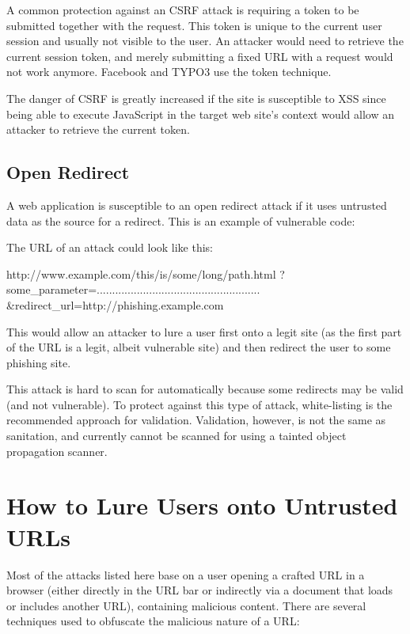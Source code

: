 A common protection against an CSRF attack is requiring a token to be submitted together with the request. This token is unique to the current user session and usually not visible to the user. An attacker would need to retrieve the current session token, and merely submitting a fixed URL with a request would not work anymore. Facebook and TYPO3 use the token technique.~\cite{facebook-tokens, typo3-csrf}

The danger of CSRF is greatly increased if the site is susceptible to XSS since being able to execute JavaScript in the target web site's context would allow an attacker to retrieve the current token.


\subsection{Open Redirect}
\label{open-redirect}

A web application is susceptible to an open redirect attack if it uses untrusted data as the source for a redirect. This is an example of vulnerable code:


The URL of an attack could look like this:

\begin{textcode}
http://www.example.com/this/is/some/long/path.html
  ?some_parameter=.....................................................
  &redirect_url=http://phishing.example.com
\end{textcode}

This would allow an attacker to lure a user first onto a legit site (as the first part of the URL is a legit, albeit vulnerable site) and then redirect the user to some phishing site.

This attack is hard to scan for automatically because some redirects may be valid (and not vulnerable). To protect against this type of attack, white-listing is the recommended approach for validation. Validation, however, is not the same as sanitation, and currently cannot be scanned for using a tainted object propagation scanner.


\section{How to Lure Users onto Untrusted URLs}
Most of the attacks listed here base on a user opening a crafted URL in a browser (either directly in the URL bar or indirectly via a document that loads or includes another URL), containing malicious content. There are several techniques used to obfuscate the malicious nature of a URL:

